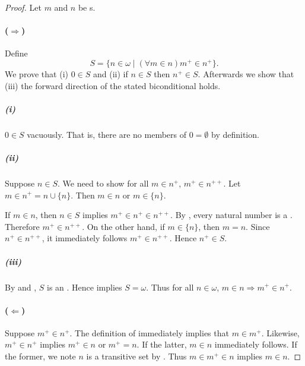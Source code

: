 \documentclass{report}
\begin{document}
  \begin{proof}

    Let $m$ and $n$ be s.

    \paragraph{($\Rightarrow$)}%

      Define $$S = \{n \in \omega \mid (\forall m \in n) m^+ \in n^+\}.$$
      We prove that (i) $0 \in S$ and (ii) if $n \in S$ then $n^+ \in S$.
      Afterwards we show that (iii) the forward direction of the stated
        biconditional holds.

      \subparagraph{(i)}%

        $0 \in S$ vacuously.
        That is, there are no members of $0 = \emptyset$ by definition.

      \subparagraph{(ii)}%

        Suppose $n \in S$.
        We need to show for all $m \in n^+$, $m^+ \in n^{++}$.
        Let $m \in n^+ = n \cup \{n\}$.
        Then $m \in n$ or $m \in \{n\}$.

        If $m \in n$, then $n \in S$ implies $m^+ \in n^+ \in n^{++}$.
        By , every natural number is a
          .
        Therefore $m^+ \in n^{++}$.
        On the other hand, if $m \in \{n\}$, then $m = n$.
        Since $n^+ \in n^{++}$, it immediately follows $m^+ \in n^{++}$.
        Hence $n^+ \in S$.

      \subparagraph{(iii)}%

        By  and , $S$ is
          an .
        Hence  implies $S = \omega$.
        Thus for all $n \in \omega$, $m \in n \Rightarrow m^+ \in n^+$.

    \paragraph{($\Leftarrow$)}%

      Suppose $m^+ \in n^+$.
      The definition of  immediately implies that
        $m \in m^+$.
      Likewise, $m^+ \in n^+$ implies $m^+ \in n$ or $m^+ = n$.
      If the latter, $m \in n$ immediately follows.
      If the former, we note $n$ is a transitive set by
        .
      Thus $m \in m^+ \in n$ implies $m \in n$.

  \end{proof}
\end{document}
